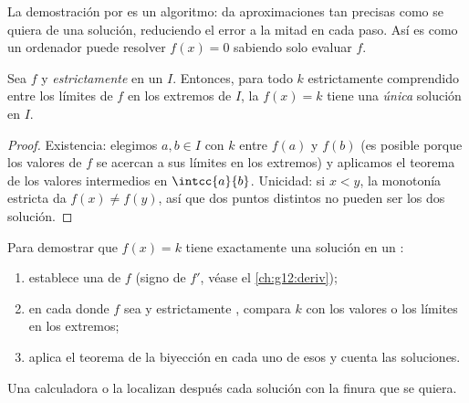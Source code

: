 \begin{remark}
La demostración por  es un algoritmo: da aproximaciones tan
precisas como se quiera de una solución, reduciendo el error a la mitad en
cada paso. Así es como un ordenador puede resolver $f(x) = 0$ sabiendo solo
evaluar $f$.
\end{remark}

\begin{theorem}\label{thm:g12:limcont:bijection}
Sea $f$  y \emph{estrictamente } en un  $I$.
Entonces, para todo $k$ estrictamente comprendido entre los límites de $f$
en los extremos de $I$, la  $f(x) = k$ tiene una \emph{única}
solución en $I$.
\end{theorem}

\begin{proof}
Existencia: elegimos $a, b \in I$ con $k$ entre $f(a)$ y $f(b)$ (es posible
porque los valores de $f$ se acercan a sus límites en los extremos) y
aplicamos el teorema de los valores intermedios en $\intcc{a}{b}$.
Unicidad: si $x < y$, la monotonía estricta da $f(x) \neq f(y)$, así que
dos puntos distintos no pueden ser los dos solución.
\end{proof}

\begin{method}[Resolver $f(x) = k$ con el teorema de la biyección]\label{met:g12:limcont:bijection}
Para demostrar que $f(x) = k$ tiene exactamente una solución en un
:
\begin{enumerate}
  \item establece una  de $f$ (signo de $f'$, véase el
        \cref{ch:g12:deriv});
  \item en cada  donde $f$ sea  y estrictamente ,
        compara $k$ con los valores o los límites en los extremos;
  \item aplica el teorema de la biyección en cada uno de esos  y
        cuenta las soluciones.
\end{enumerate}
Una calculadora o la  localizan después cada solución con la
finura que se quiera.
\end{method}

